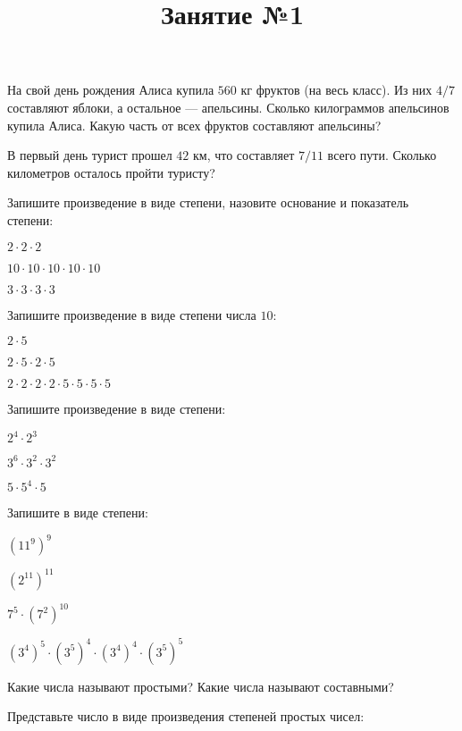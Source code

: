 \title{Занятие №1}
\begin{listofex}
	\item На свой день рождения Алиса купила \( 560 \) кг фруктов (на весь класс). Из них \( 4/7 \) составляют яблоки, а остальное --- апельсины. Сколько килограммов апельсинов купила Алиса. Какую часть от всех фруктов составляют апельсины?
	\item В первый день турист прошел \( 42 \) км, что составляет \( 7/11 \) всего пути. Сколько километров осталось пройти туристу?
	\item Запишите произведение в виде степени, назовите основание и показатель степени:
	\begin{enumcols}[itemcolumns=3]
		\item \( 2\cdot2\cdot2 \)
		\item \( 10\cdot10\cdot10\cdot10\cdot10 \)
		\item \( 3\cdot3\cdot3\cdot3 \)
	\end{enumcols}
	\item Запишите произведение в виде степени числа \( 10 \):
	\begin{enumcols}[itemcolumns=3]
		\item \( 2\cdot5 \)
		\item \( 2\cdot5\cdot2\cdot5 \)
		\item \( 2\cdot2\cdot2\cdot2\cdot5\cdot5\cdot5\cdot5 \)
	\end{enumcols}
	\item Запишите произведение в виде степени:
	\begin{enumcols}[itemcolumns=3]
		\item \( 2^4\cdot2^3 \)
		\item \( 3^6\cdot3^2\cdot3^2 \)
		\item \( 5\cdot5^4\cdot5 \)
	\end{enumcols}
	\item Запишите в виде степени:
	\begin{enumcols}[itemcolumns=3]
		\item \( (11^9)^9 \)
		\item \( (2^{11})^{11} \)
		\item \( 7^5\cdot(7^2)^{10} \)
		\item \( (3^4)^5\cdot(3^5)^4\cdot(3^4)^4\cdot(3^5)^5 \)
	\end{enumcols}
	\item Какие числа называют простыми? Какие числа называют составными?
	\item Представьте число в виде произведения степеней простых чисел:

\end{listofex}
